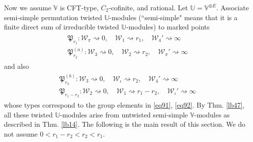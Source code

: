 \documentclass[11pt,b5paper,notitlepage]{article}
\theoremstyle{definition}
\theoremstyle{plain}
\newcommand{\fk}{\mathfrak}
\newcommand{\mc}{\mathcal}
\newcommand{\Vbb}{\mathbb V}
\newcommand{\Ubb}{\mathbb U}
\numberwithin{equation}{subsection}
\begin{document}
Now we assume $\Vbb$ is CFT-type, $C_2$-cofinite, and rational. Let $\Ubb=\Vbb^{\otimes E}$.  Associate semi-simple  permutation twisted $\Ubb$-modules (``semi-simple" means that it is a finite direct sum of irreducible twisted $\Ubb$-modules) to marked points
\begin{gather}\label{eq93}
	\begin{array}{c}
		\fk P_{r_1}: \mc W_\pi\rightsquigarrow 0,\quad \mc W_1\rightsquigarrow	r_1,\quad \mc W_4'\rightsquigarrow \infty\\[0.7ex]
		\fk P_{r_2}^{(a)}: \mc W_3\rightsquigarrow 0,\quad \mc W_2\rightsquigarrow	r_2,\quad \mc W_\pi'\rightsquigarrow \infty
	\end{array}
\end{gather}
and also
\begin{gather}\label{eq94}
	\begin{array}{c}
		\fk P_{r_2}^{(b)}: \mc W_3\rightsquigarrow 0,\quad \mc W_\iota\rightsquigarrow	r_2,\quad \mc W_4'\rightsquigarrow \infty\\[0.7ex]
		\fk P_{r_1-r_2}: \mc W_2\rightsquigarrow 0,\quad \mc W_1\rightsquigarrow	r_1-r_2,\quad \mc W_\iota'\rightsquigarrow \infty
	\end{array}
\end{gather}
whose types correspond to the group elements in \eqref{eq91}, \eqref{eq92}. By Thm. \ref{lb47}, all these twisted $\Ubb$-modules arise from untwisted  semi-simple $\Vbb$-modules as described in Thm. \ref{lb14}. The following is the main result of this section. We do not assume $0<r_1-r_2<r_2<r_1$. 
\end{document}
